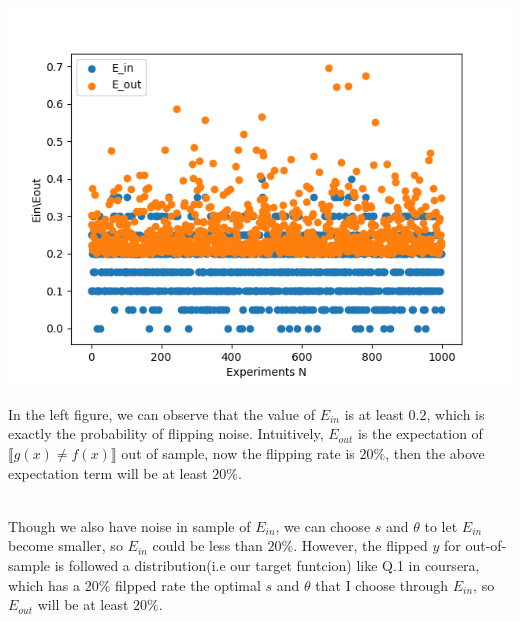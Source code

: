 \documentclass[a4paper,12pt]{article}
\begin{document}
\section{}
  \begin{minipage}{\linewidth}
      \begin{minipage}{0.5\linewidth}
\raggedright
         \includegraphics[scale=0.55]{Q81.png}

      \end{minipage}
      \hspace{0.05\linewidth}
      \begin{minipage}{0.4\linewidth}
        In the left figure, we can observe that the value of $E_{in}$ is at least $0.2$, which is exactly the probability of flipping noise. Intuitively, $E_{out}$ is the expectation of $\llbracket g(x) \neq f(x) \rrbracket$ out of sample, now the flipping rate is $20\%$, then the above expectation term will be at least $20\%$.    
      \end{minipage}
  \end{minipage}
 \\ 
Though we also have noise in sample of $E_{in}$, we can choose $s$ and $\theta$ to let $E_{in}$ become smaller, so $E_{in}$ could be less than $20\%$. However, the flipped $y$  for out-of-sample is followed a distribution(i.e our target funtcion) like Q.1 in coursera, which has a $20\%$ filpped rate the optimal $s$ and $\theta$ that I choose through $E_{in}$, so $E_{out}$ will be at least $20\%$. \\
\newline
\end{document}
